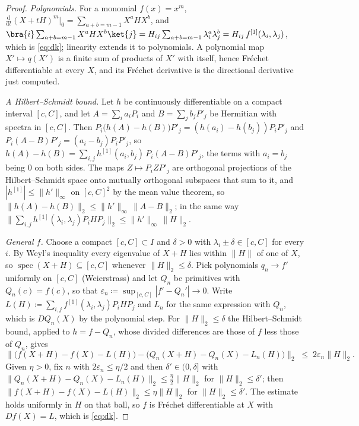 \begin{proof}
\begin{sloppypar}
\emph{Polynomials.} For a monomial $f(x)=x^{m}$,
$\frac{\mathrm d}{\mathrm dt}(X+tH)^{m}\big|_{0}
=\sum_{a+b=m-1}X^{a}HX^{b}$, and
$\bra{i}\sum_{a+b=m-1}X^aHX^b\ket{j}
=H_{ij}\sum_{a+b=m-1}\lambda_i^a\lambda_j^b
=H_{ij}\,f^{[1]}(\lambda_i,\lambda_j)$, which is \eqref{eq:dk}; linearity
extends it to polynomials. A polynomial map $X'\mapsto q(X')$ is a finite
sum of products of $X'$ with itself, hence Fr\'echet differentiable at every
$X$, and its Fr\'echet derivative is the directional derivative just
computed.

\emph{A Hilbert--Schmidt bound.} Let $h$ be continuously differentiable on a
compact interval $[c,C]$, and let $A=\sum_ia_iP_i$ and $B=\sum_jb_jP'_j$ be
Hermitian with spectra in $[c,C]$. Then
$P_i\big(h(A)-h(B)\big)P'_j=(h(a_i)-h(b_j))P_iP'_j$ and
$P_i(A-B)P'_j=(a_i-b_j)P_iP'_j$, so
$h(A)-h(B)=\sum_{i,j}h^{[1]}(a_i,b_j)\,P_i(A-B)P'_j$, the terms with
$a_i=b_j$ being $0$ on both sides. The maps $Z\mapsto P_iZP'_j$ are
orthogonal projections of the Hilbert--Schmidt space onto mutually
orthogonal subspaces that sum to it, and $|h^{[1]}|\le\|h'\|_{\infty}$ on
$[c,C]^2$ by the mean value theorem, so
$\|h(A)-h(B)\|_2\le\|h'\|_{\infty}\,\|A-B\|_2$; in the same way
$\|\sum_{i,j}h^{[1]}(\lambda_i,\lambda_j)P_iHP_j\|_2
\le\|h'\|_{\infty}\,\|H\|_2$.

\emph{General $f$.} Choose a compact $[c,C]\subset I$ and $\delta>0$ with
$\lambda_i\pm\delta\in[c,C]$ for every $i$. By Weyl's inequality every
eigenvalue of $X+H$ lies within $\|H\|$ of one of $X$, so
$\operatorname{spec}(X+H)\subseteq[c,C]$ whenever $\|H\|_2\le\delta$. Pick
polynomials $q_n\to f'$ uniformly on $[c,C]$ (Weierstrass) and let $Q_n$ be
primitives with $Q_n(c)=f(c)$, so that
$\varepsilon_n\coloneqq\sup_{[c,C]}|f'-Q_n'|\to0$. Write
$L(H)\coloneqq\sum_{i,j}f^{[1]}(\lambda_i,\lambda_j)P_iHP_j$ and $L_n$ for
the same expression with $Q_n$, which is $DQ_n(X)$ by the polynomial step.
For $\|H\|_2\le\delta$ the Hilbert--Schmidt bound, applied to $h=f-Q_n$,
whose divided differences are those of $f$ less those of $Q_n$, gives
\begin{equation*}
  \big\|\big(f(X+H)-f(X)-L(H)\big)
  -\big(Q_n(X+H)-Q_n(X)-L_n(H)\big)\big\|_2
  \;\le\;2\varepsilon_n\|H\|_2 .
\end{equation*}
Given $\eta>0$, fix $n$ with $2\varepsilon_n\le\eta/2$ and then
$\delta'\in(0,\delta]$ with
$\|Q_n(X+H)-Q_n(X)-L_n(H)\|_2\le\frac{\eta}{2}\|H\|_2$ for
$\|H\|_2\le\delta'$; then $\|f(X+H)-f(X)-L(H)\|_2\le\eta\|H\|_2$ for
$\|H\|_2\le\delta'$. The estimate holds uniformly in $H$ on that ball, so
$f$ is Fr\'echet differentiable at $X$ with $Df(X)=L$, which is
\eqref{eq:dk}.


\end{sloppypar}
\end{proof}
